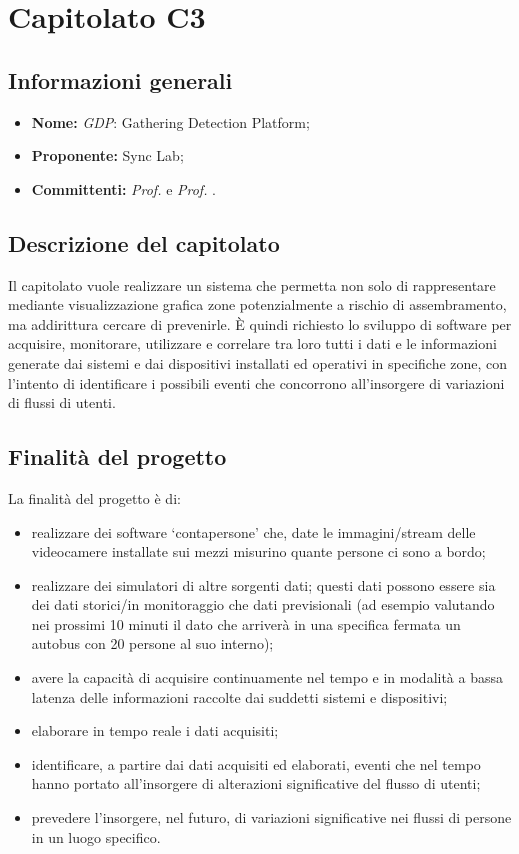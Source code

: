 \section{Capitolato C3}

\subsection{Informazioni generali}
\begin{itemize}
\item \textbf{Nome:} \textit{GDP}: Gathering Detection Platform;
\item \textbf{Proponente:} Sync Lab;
\item \textbf{Committenti:} \textit{Prof. \Tullio{}} e \textit{Prof. \Riccardo{}}.
\end{itemize}

\subsection{Descrizione del capitolato}
Il capitolato vuole realizzare un sistema che permetta non solo di rappresentare mediante visualizzazione grafica zone potenzialmente a rischio di assembramento, ma addirittura cercare di prevenirle. È quindi richiesto lo sviluppo di software per acquisire, monitorare, utilizzare e correlare tra loro tutti i dati e le informazioni generate dai sistemi e dai dispositivi installati ed operativi in specifiche zone, con l'intento di identificare i possibili eventi che concorrono all'insorgere di variazioni di flussi di utenti. 

\subsection{Finalità del progetto}
La finalità del progetto è di:
\begin{itemize}
\item realizzare dei software ‘contapersone’ che, date le immagini/stream delle videocamere installate sui mezzi misurino quante persone ci sono a bordo;
\item realizzare dei simulatori di altre sorgenti dati; questi dati possono essere sia dei dati storici/in monitoraggio che dati previsionali
(ad esempio valutando nei prossimi 10 minuti il dato che arriverà in una specifica fermata un autobus con 20 persone al suo interno);
\item avere la capacità di acquisire continuamente nel tempo e in modalità a bassa latenza delle informazioni
raccolte dai suddetti sistemi e dispositivi;
\item elaborare in tempo reale i dati acquisiti;
\item identificare, a partire dai dati acquisiti ed elaborati, eventi che nel tempo hanno portato all'insorgere di alterazioni significative del flusso di utenti;
\item prevedere l'insorgere, nel futuro, di variazioni significative nei flussi di persone in un luogo specifico.
\end{itemize}

